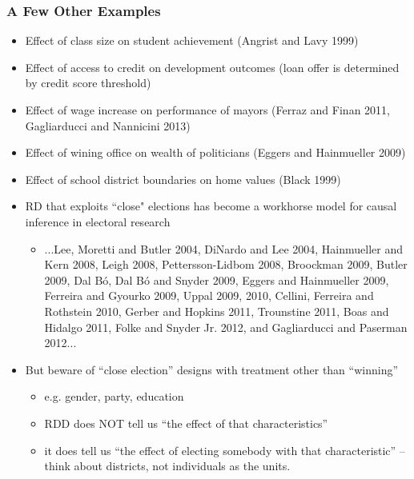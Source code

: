 \documentclass[xcolor=dvipsnames]{beamer}
\begin{document}
\begin{frame}
\frametitle{A Few Other Examples}
\footnotesize
\begin{itemize}
\item Effect of class size on student achievement (Angrist and Lavy 1999)
\item Effect of access to credit on development outcomes (loan offer is determined by credit score threshold)
\item Effect of wage increase on performance of mayors (Ferraz and Finan 2011, Gagliarducci and Nannicini 2013)
\item Effect of wining office on wealth of politicians (Eggers and Hainmueller 2009)
\item Effect of school district boundaries on home values (Black 1999)
\item RD that exploits ``close" elections has become a workhorse model for causal inference in electoral research
\begin{itemize}
\item[] ...\tiny{Lee, Moretti and Butler 2004, DiNardo and Lee 2004, Hainmueller and Kern 2008,
Leigh 2008, Pettersson-Lidbom 2008, Broockman 2009, Butler 2009, Dal B\'{o}, Dal B\'{o} and Snyder 2009,
Eggers and Hainmueller 2009, Ferreira and Gyourko 2009, Uppal 2009, 2010, Cellini, Ferreira and Rothstein 2010, Gerber and Hopkins 2011, Trounstine 2011, Boas and Hidalgo 2011, Folke and Snyder Jr.
2012, and Gagliarducci and Paserman 2012}...
\end{itemize}
\item But beware of ``close election'' designs with treatment other than ``winning''
\begin{itemize}
\footnotesize
\item e.g. gender, party, education
\item RDD does NOT tell us ``the effect of that characteristics''
\item it does tell us ``the effect of electing somebody with that characteristic'' -- think about districts, not individuals as the units.
\end{itemize}
\end{itemize}
\end{frame}
\end{document}
